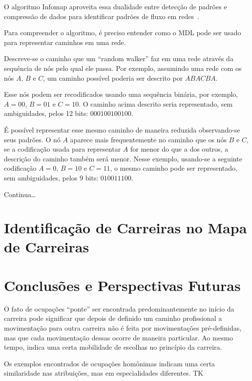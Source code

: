 \documentclass[
  article,
  11pt,
  a4paper,
  english,
  brazil,
  sumario=tradicional]{abntex2}
\begin{document}
O algoritmo Infomap aproveita essa dualidade entre detecção de padrões e compressão de dados para identificar padrões de fluxo em redes~\cite{Rosvall2009-sd}.

Para compreender o algoritmo, é preciso entender como o MDL pode ser usado para representar caminhos em uma rede.

Descreve-se o caminho que um \enquote{random walker} faz em uma rede através da sequência de nós pelo qual ele passa. Por exemplo, assumindo uma rede com os nós $A$, $B$ e $C$, um caminho possível poderia ser descrito por $ABACBA$.

Esse nós podem ser recodificados usando uma sequência binária, por exemplo, $A = 00$, $B = 01$ e $C = 10$. O caminho acima descrito seria representado, sem ambiguidades, pelos 12 bits: $000100100100$.

É possível representar esse mesmo caminho de maneira reduzida observando-se seus padrões. O nó $A$ aparece mais frequentemente no caminho que os nós $B$ e $C$, se a codificação usada para representar $A$ for menor do que a dos outros, a descrição do caminho também será menor. Nesse exemplo, usando-se a seguinte codificação $A = 0$, $B = 10$ e $C = 11$, o mesmo caminho pode ser representado, sem ambiguidades, pelos 9 bits: $010011100$.

Continua\ldots

\section{Identificação de Carreiras no Mapa de Carreiras}

\section{Conclusões e Perspectivas Futuras}

O fato de ocupações \enquote{ponte} ser encontrada predominantemente no início da carreira pode significar que depois de definido um caminho profissional a movimentação para outra carreira não é feita por movimentações pré-definidas, mas que cada movimentação dessas ocorre de maneira particular. Ao mesmo tempo, indica uma certa mobilidade de escolhas no princípio da carreira.

Os exemplos encontrados de ocupações homônimas indicam uma certa similaridade nas atribuições, mas em especialidades diferentes. TK

\newpage


\end{document}
